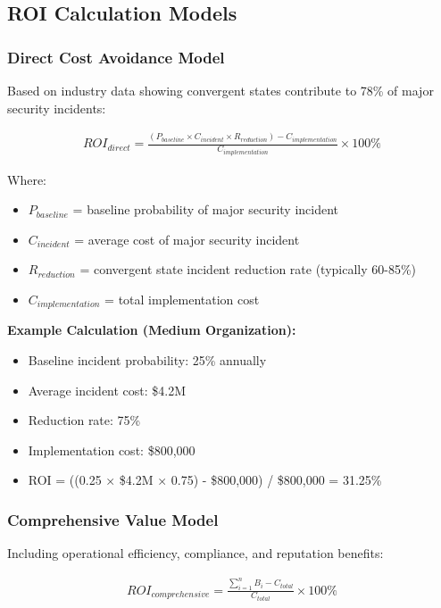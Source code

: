 \documentclass[11pt,a4paper]{article}
\begin{document}
\subsection{ROI Calculation Models}

\subsubsection{Direct Cost Avoidance Model}

Based on industry data showing convergent states contribute to 78\% of major security incidents:

\begin{align}
ROI_{direct} = \frac{(P_{baseline} \times C_{incident} \times R_{reduction}) - C_{implementation}}{C_{implementation}} \times 100\%
\end{align}

Where:
\begin{itemize}
\item $P_{baseline}$ = baseline probability of major security incident
\item $C_{incident}$ = average cost of major security incident
\item $R_{reduction}$ = convergent state incident reduction rate (typically 60-85\%)
\item $C_{implementation}$ = total implementation cost
\end{itemize}

\textbf{Example Calculation (Medium Organization):}
\begin{itemize}
\item Baseline incident probability: 25\% annually
\item Average incident cost: \$4.2M
\item Reduction rate: 75\%
\item Implementation cost: \$800,000
\item ROI = ((0.25 × \$4.2M × 0.75) - \$800,000) / \$800,000 = 31.25\%
\end{itemize}

\subsubsection{Comprehensive Value Model}

Including operational efficiency, compliance, and reputation benefits:

\begin{align}
ROI_{comprehensive} = \frac{\sum_{i=1}^{n} B_i - C_{total}}{C_{total}} \times 100\%
\end{align}
\end{document}
